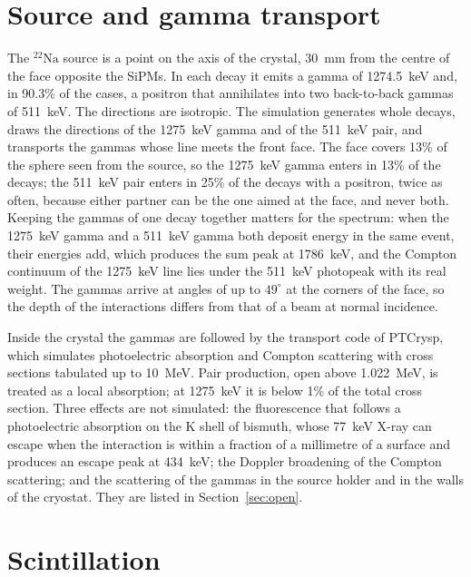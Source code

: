 \documentclass[11pt]{article}
\newcommand{\Na}{\ensuremath{{}^{22}\mathrm{Na}}\xspace}
\begin{document}
\section{Source and gamma transport}
\label{sec:gamma}

The \Na source is a point on the axis of the crystal, 30~mm from the centre
of the face opposite the SiPMs. In each decay it emits a gamma of
1274.5~keV and, in 90.3\% of the cases, a positron that annihilates into two
back-to-back gammas of 511~keV. The directions are isotropic. The simulation
generates whole decays, draws the directions of the 1275~keV gamma and of
the 511~keV pair, and transports the gammas whose line meets the front face.
The face covers 13\% of the sphere seen from the source, so the 1275~keV
gamma enters in 13\% of the decays; the 511~keV pair enters in 25\% of the
decays with a positron, twice as often, because either partner can be the
one aimed at the face, and never both. Keeping the gammas of one decay together
matters for the spectrum: when the 1275~keV gamma and a 511~keV gamma both
deposit energy in the same event, their energies add, which produces the sum
peak at 1786~keV, and the Compton continuum of the 1275~keV line lies under
the 511~keV photopeak with its real weight. The gammas arrive at angles of up
to $49^\circ$ at the corners of the face, so the depth of the interactions
differs from that of a beam at normal incidence.

Inside the crystal the gammas are followed by the transport code of
PTCrysp, which simulates photoelectric absorption and Compton scattering with
cross sections tabulated up to 10~MeV. Pair production, open above
1.022~MeV, is treated as a local absorption; at 1275~keV it is below 1\% of
the total cross section. Three effects are not simulated: the fluorescence
that follows a photoelectric absorption on the K shell of bismuth, whose
77~keV X-ray can escape when the interaction is within a fraction of a
millimetre of a surface and produces an escape peak at 434~keV; the Doppler
broadening of the Compton scattering; and the scattering of the gammas in the
source holder and in the walls of the cryostat. They are listed in
Section~\ref{sec:open}.

\section{Scintillation}
\label{sec:scintillation}
\end{document}
